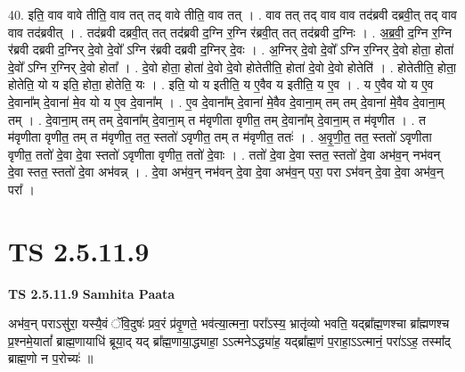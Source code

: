 \documentclass[17pt]{extarticle}
\begin{document}
40. इति॒ वाव वावे तीति॒ वाव तत् तद् वावे तीति॒ वाव तत् । . वाव तत् तद् वाव वाव तद॑ब्रवी दब्रवी॒त् तद् वाव वाव तद॑ब्रवीत् । . तद॑ब्रवी दब्रवी॒त् तत् तद॑ब्रवी द॒ग्नि र॒ग्नि र॑ब्रवी॒त् तत् तद॑ब्रवी द॒ग्निः । . अ॒ब्र॒वी॒ द॒ग्नि र॒ग्नि र॑ब्रवी दब्रवी द॒ग्निर् दे॒वो दे॒वो᳚ ऽग्नि र॑ब्रवी दब्रवी द॒ग्निर् दे॒वः । . अ॒ग्निर् दे॒वो दे॒वो᳚ ऽग्नि र॒ग्निर् दे॒वो होता॒ होता॑ दे॒वो᳚ ऽग्नि र॒ग्निर् दे॒वो होता᳚ । . दे॒वो होता॒ होता॑ दे॒वो दे॒वो होतेतीति॒ होता॑ दे॒वो दे॒वो होतेति॑ । . होतेतीति॒ होता॒ होतेति॒ यो य इति॒ होता॒ होतेति॒ यः । . इति॒ यो य इतीति॒ य ए॒वैव य इतीति॒ य ए॒व । . य ए॒वैव यो य ए॒व दे॒वाना᳚म् दे॒वाना॑ मे॒व यो य ए॒व दे॒वाना᳚म् । . ए॒व दे॒वाना᳚म् दे॒वाना॑ मे॒वैव दे॒वाना॒म् तम् तम् दे॒वाना॑ मे॒वैव दे॒वाना॒म् तम् । . दे॒वाना॒म् तम् तम् दे॒वाना᳚म् दे॒वाना॒म् त म॑वृणीता वृणीत॒ तम् दे॒वाना᳚म् दे॒वाना॒म् त म॑वृणीत । . त म॑वृणीता वृणीत॒ तम् त म॑वृणीत॒ तत॒ स्ततो॑ ऽवृणीत॒ तम् त म॑वृणीत॒ ततः॑ । . अ॒वृ॒णी॒त॒ तत॒ स्ततो॑ ऽवृणीता वृणीत॒ ततो॑ दे॒वा दे॒वा स्ततो॑ ऽवृणीता वृणीत॒ ततो॑ दे॒वाः । . ततो॑ दे॒वा दे॒वा स्तत॒ स्ततो॑ दे॒वा अभ॑व॒न् नभ॑वन् दे॒वा स्तत॒ स्ततो॑ दे॒वा अभ॑वन्न् । . दे॒वा अभ॑व॒न् नभ॑वन् दे॒वा दे॒वा अभ॑व॒न् परा॒ परा ऽभ॑वन् दे॒वा दे॒वा अभ॑व॒न् परा᳚ । \newline
\pagebreak
{}

\section{ TS 2.5.11.9 }

\textbf{TS 2.5.11.9 } \newline
\textbf{Samhita Paata} \newline

अभ॑व॒न् पराऽसु॑रा॒ यस्यै॒वं ॅवि॒दुषः॑ प्रव॒रं प्र॑वृ॒णते॒ भव॑त्या॒त्मना॒ परा᳚ऽस्य॒ भ्रातृ॑व्यो भवति॒ यद्ब्रा᳚ह्म॒णश्चा ब्रा᳚ह्मणश्च प्र॒श्नमे॒यातां᳚ ब्राह्म॒णायाधि॑ ब्रूया॒द् यद् ब्रा᳚ह्म॒णाया॒द्ध्याहा॒ ऽऽत्मनेऽद्ध्या॑ह॒ यद्ब्रा᳚ह्म॒णं प॒राहा॒ऽऽत्मानं॒ परा॑ऽऽह॒ तस्मा᳚द् ब्राह्म॒णो न प॒रोच्यः॑ ॥ \newline
\end{document}
